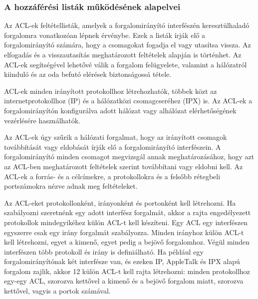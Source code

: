 \subsubsection{A hozzáférési listák működésének alapelvei}
Az ACL-ek feltétellisták, amelyek a forgalomirányító interfészén keresztülhaladó forgalomra
vonatkozóan lépnek érvénybe. Ezek a listák írják elő a forgalomirányító számára, hogy a
csomagokat fogadja el vagy utasítsa vissza. Az elfogadás és a visszautasítás meghatározott
feltételek alapján is történhet. Az ACL-ek segítségével lehetővé válik a forgalom felügyelete,
valamint a hálózatról kiinduló és az oda befutó elérések biztonságossá tétele.

ACL-ek minden irányított protokollhoz létrehozhatók, többek közt az internetprotokollhoz
(IP) és a hálózatközi csomagcseréhez (IPX) is. Az ACL-ek a forgalomirányítón konfigurálva
adott hálózat vagy alhálózat elérhetőségének vezérlésére használhatók.

Az ACL-ek úgy szűrik a hálózati forgalmat, hogy az irányított csomagok továbbítását vagy
eldobását írják elő a forgalomirányító interfészein. A forgalomirányító minden csomagot
megvizsgál annak meghatározásához, hogy azt az ACL-ben meghatározott feltételek szerint
továbbítani vagy eldobni kell. Az ACL-ek a forrás- és a célcímekre, a protokollokra és a
felsőbb rétegbeli portszámokra nézve adnak meg feltételeket.

Az ACL-eket protokollonként, irányonként és portonként kell létrehozni. Ha szabályozni
szeretnénk egy adott interfész forgalmát, akkor a rajta engedélyezett protokollok
mindegyikéhez külön ACL-t kell készíteni. Egy ACL egy interfészen egyszerre csak egy
irány forgalmát szabályozza. Minden irányhoz külön ACL-t kell létrehozni, egyet a kimenő,
egyet pedig a bejövő forgalomhoz. Végül minden interfészen több protokoll és irány is
definiálható. Ha például egy forgalomirányítónak két interfésze van, és ezeken IP, AppleTalk
és IPX alapú forgalom zajlik, akkor 12 külön ACL-t kell rajta létrehozni: minden
protokollhoz egy-egy ACL, szorozva kettővel a kimenő és a bejövő forgalom miatt, szorozva
kettővel, vagyis a portok számával.

